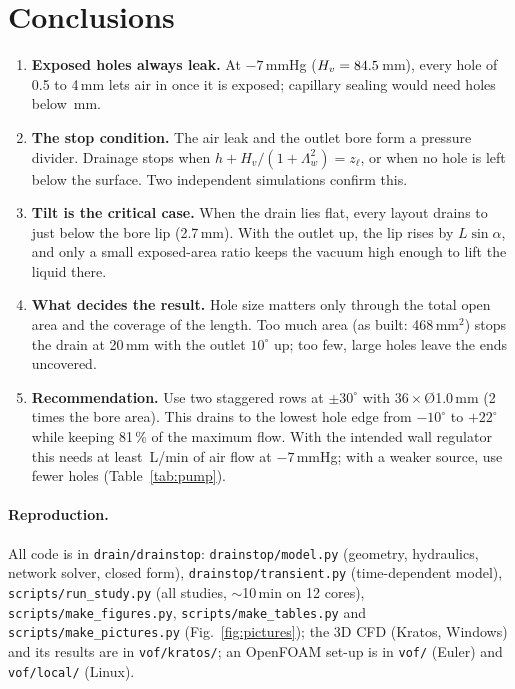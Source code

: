 \documentclass[10pt,a4paper]{article}
\newcommand{\Lw}{\Lambda_{w}}
\newcommand{\zl}{z_\ell}
\begin{document}
\section{Conclusions}
\begin{enumerate}
\item \textbf{Exposed holes always leak.} At $-7$\,mmHg ($H_v=84.5$\,mm), every hole of 0.5 to 4\,mm lets air in once it is exposed; capillary sealing would need holes below \numdstar\,mm.
\item \textbf{The stop condition.} The air leak and the outlet bore form a pressure divider. Drainage stops when $h+H_v/(1+\Lw^2)=\zl$, or when no hole is left below the surface. Two independent simulations confirm this.
\item \textbf{Tilt is the critical case.} When the drain lies flat, every layout drains to just below the bore lip (2.7\,mm). With the outlet up, the lip rises by $L\sin\alpha$, and only a small exposed-area ratio keeps the vacuum high enough to lift the liquid there.
\item \textbf{What decides the result.} Hole size matters only through the total open area and the coverage of the length. Too much area (as built: 468\,mm$^2$) stops the drain at 20\,mm with the outlet $10^\circ$ up; too few, large holes leave the ends uncovered.
\item \textbf{Recommendation.} Use two staggered rows at $\pm30^\circ$ with $36\times$\O1.0\,mm (2 times the bore area). This drains to the lowest hole edge from $-10^\circ$ to $+22^\circ$ while keeping 81\,\% of the maximum flow. With the intended wall regulator this needs at least \numcapTwenty\,L/min of air flow at $-7$\,mmHg; with a weaker source, use fewer holes (Table~\ref{tab:pump}).
\end{enumerate}

\sloppy
\paragraph{Reproduction.} All code is in \texttt{drain/drainstop}: \texttt{drainstop/model.py} (geometry, hydraulics, network solver, closed form), \texttt{drainstop/transient.py} (time-dependent model), \texttt{scripts/run\_study.py} (all studies, $\sim$10\,min on 12 cores), \texttt{scripts/make\_figures.py}, \texttt{scripts/make\_tables.py} and \texttt{scripts/make\_pictures.py} (Fig.~\ref{fig:pictures}); the 3D CFD (Kratos, Windows) and its results are in \texttt{vof/kratos/}; an OpenFOAM set-up is in \texttt{vof/} (Euler) and \texttt{vof/local/} (Linux).
\end{document}
